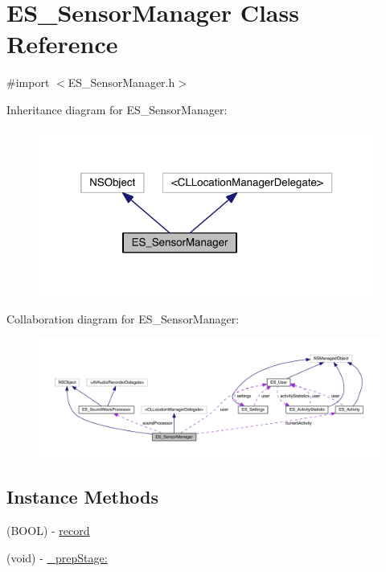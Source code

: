 \hypertarget{interface_e_s___sensor_manager}{\section{E\+S\+\_\+\+Sensor\+Manager Class Reference}
\label{interface_e_s___sensor_manager}
}


{\ttfamily \#import $<$E\+S\+\_\+\+Sensor\+Manager.\+h$>$}



Inheritance diagram for E\+S\+\_\+\+Sensor\+Manager\+:\nopagebreak
\begin{figure}[H]
\begin{center}
\leavevmode
\includegraphics[width=313pt]{d5/dd0/interface_e_s___sensor_manager__inherit__graph}
\end{center}
\end{figure}


Collaboration diagram for E\+S\+\_\+\+Sensor\+Manager\+:\nopagebreak
\begin{figure}[H]
\begin{center}
\leavevmode
\includegraphics[width=350pt]{dc/d30/interface_e_s___sensor_manager__coll__graph}
\end{center}
\end{figure}
\subsection*{Instance Methods}
\begin{DoxyCompactItemize}
\item 
(B\+O\+O\+L) -\/ \hyperlink{interface_e_s___sensor_manager_a2f2ebc527955f5ab7373c6d21b6f894e}{record}
\item 
(void) -\/ \hyperlink{interface_e_s___sensor_manager_a050049cb411299252771d7e41d47ad16}{\+\_\+prep\+Stage\+:}
\end{DoxyCompactItemize}

